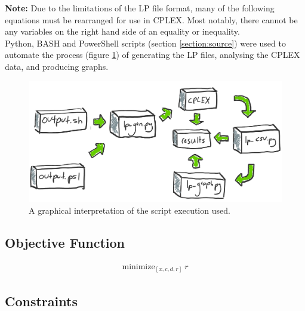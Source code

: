 \documentclass[12pt]{article} %
\begin{document}
\noindent \textbf{Note:} Due to the limitations of the LP file format, many of the following equations must be rearranged for use in CPLEX. Most notably, there cannot be any variables on the right hand side of an equality or inequality. \\

\noindent Python, BASH and PowerShell scripts (section \ref{section:source}) were used to automate the process (figure \ref{fig:scriptflow}) of generating the LP files, analysing the CPLEX data, and producing graphs.

\begin{figure}[H]
	\centering
	\includegraphics[width=\textwidth]{scriptflow}
	\caption{A graphical interpretation of the script execution used.}
	\label{fig:scriptflow}
\end{figure}

\newpage

\subsection{Objective Function}

\begin{align}
\label{eq:obj_func_def}
\text{minimize}_{[x, c, d, r]}\ r
\end{align}

\subsection{Constraints}
\end{document}
